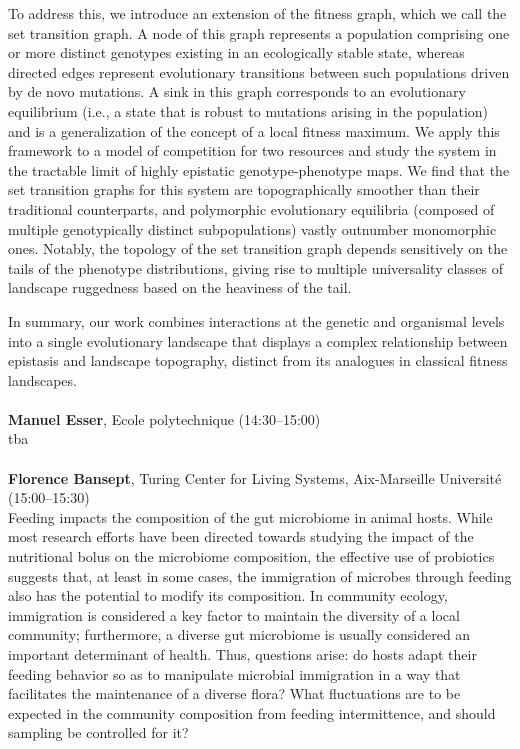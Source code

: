 \documentclass[12pt,a4paper]{article}
\begin{document}
 To address this, we introduce an extension of the fitness graph, which we call the set transition graph. A node of this graph represents a population comprising one or more distinct genotypes existing in an ecologically stable state, whereas directed edges represent evolutionary transitions between such populations driven by de novo mutations. A sink in this graph corresponds to an evolutionary equilibrium (i.e., a state that is robust to mutations arising in the population) and is a generalization of the concept of a local fitness maximum. We apply this framework to a model of competition for two resources and study the system in the tractable limit of highly epistatic genotype-phenotype maps. We find that the set transition graphs for this system are topographically smoother than their traditional counterparts, and polymorphic evolutionary equilibria (composed of multiple genotypically distinct subpopulations) vastly outnumber monomorphic ones. Notably, the topology of the set transition graph depends sensitively on the tails of the phenotype distributions, giving rise to multiple universality classes of landscape ruggedness based on the heaviness of the tail. 

 In summary, our work combines interactions at the genetic and organismal levels into a single evolutionary landscape that displays a complex relationship between epistasis and landscape topography, distinct from its analogues in classical fitness landscapes.  \\
\\[1ex]{ \large \textbf{ Manuel Esser}}, Ecole polytechnique (14:30--15:00) \\[2ex] tba \\
\\[1ex]{ \large \textbf{ Florence Bansept}}, Turing Center for Living Systems, Aix-Marseille Université (15:00--15:30) \\[2ex] Feeding impacts the composition of the gut microbiome in animal hosts. While most research efforts have been directed towards studying the impact of the nutritional bolus on the microbiome composition, the effective use of probiotics suggests that, at least in some cases, the immigration of microbes through feeding also has the potential to modify its composition. In community ecology, immigration is considered a key factor to maintain the diversity of a local community; furthermore, a diverse gut microbiome is usually considered an important determinant of health. Thus, questions arise: do hosts adapt their feeding behavior so as to manipulate microbial immigration in a way that facilitates the maintenance of a diverse flora? What fluctuations are to be expected in the community composition from feeding intermittence, and should sampling be controlled for it?  
\end{document}
